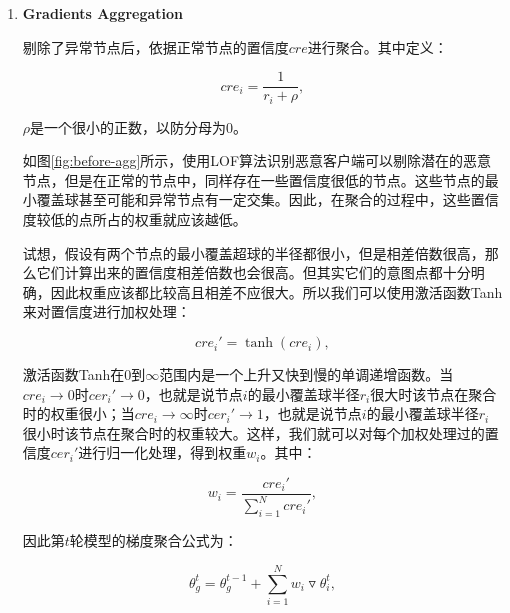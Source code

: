 \documentclass[lettersize,journal]{IEEEtran}
\begin{document}
\begin{enumerate}
\item \textbf{Gradients Aggregation}

剔除了异常节点后，依据正常节点的置信度$cre$进行聚合。其中定义：

\begin{equation}
    cre_i=\frac{1}{r_i+\rho},
\end{equation}

$\rho$是一个很小的正数，以防分母为$0$。

如图\ref{fig:before-agg}所示，使用LOF算法识别恶意客户端可以剔除潜在的恶意节点，但是在正常的节点中，同样存在一些置信度很低的节点。这些节点的最小覆盖球甚至可能和异常节点有一定交集。因此，在聚合的过程中，这些置信度较低的点所占的权重就应该越低。

试想，假设有两个节点的最小覆盖超球的半径都很小，但是相差倍数很高，那么它们计算出来的置信度相差倍数也会很高。但其实它们的意图点都十分明确，因此权重应该都比较高且相差不应很大。所以我们可以使用激活函数Tanh来对置信度进行加权处理：

\begin{equation}
    cre_i'=\tanh(cre_i),
\end{equation}

激活函数Tanh在$0$到$\infty$范围内是一个上升又快到慢的单调递增函数。当$cre_i\to 0$时$cer_i'\to 0$，也就是说节点$i$的最小覆盖球半径$r_i$很大时该节点在聚合时的权重很小；当$cre_i\to \infty$时$cer_i'\to 1$，也就是说节点$i$的最小覆盖球半径$r_i$很小时该节点在聚合时的权重较大。这样，我们就可以对每个加权处理过的置信度$cer_i'$进行归一化处理，得到权重$w_i$。其中：

\begin{equation}
    w_i=\frac{cre_i'}{\sum_{i=1}^{N}cre_i'},
\end{equation}

因此第$t$轮模型的梯度聚合公式为：

\begin{equation}
    \theta_g^t = \theta_g^{t-1}+\sum_{i=1}^{N}w_i\triangledown \theta_i^t,
\end{equation}




\end{enumerate}
\end{document}
